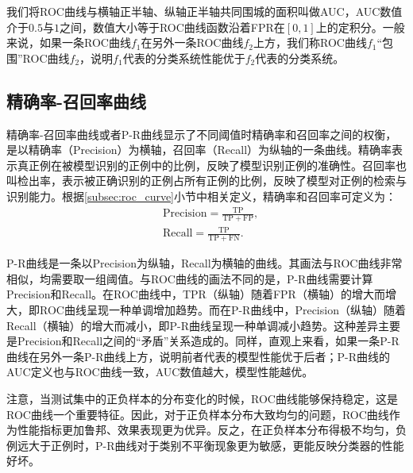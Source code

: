 我们将ROC曲线与横轴正半轴、纵轴正半轴共同围城的面积叫做AUC，AUC数值介于$0.5$与$1$之间，数值大小等于ROC曲线函数沿着FPR在$[0,1]$上的定积分。一般来说，如果一条ROC曲线$f_1$在另外一条ROC曲线$f_2$上方，我们称ROC曲线$f_1$“包围”ROC曲线$f_2$，说明$f_1$代表的分类系统性能优于$f_2$代表的分类系统。
\subsection{精确率-召回率曲线}\label{subsec:pr_curve}
精确率-召回率曲线或者P-R曲线显示了不同阈值时精确率和召回率之间的权衡，是以精确率（Precision）为横轴，召回率（Recall）为纵轴的一条曲线。精确率表示真正例在被模型识别的正例中的比例，反映了模型识别正例的准确性。召回率也叫检出率，表示被正确识别的正例占所有正例的比例，反映了模型对正例的检索与识别能力。根据\ref{subsec:roc_curve}小节中相关定义，精确率和召回率可定义为：
\begin{align}
	&\mathrm{Precision}=\frac{\mathrm{TP}}{\mathrm{TP}+\mathrm{FP}},\\
	&\mathrm{Recall}=\frac{\mathrm{TP}}{\mathrm{TP}+\mathrm{FN}}.
\end{align}


P-R曲线是一条以Precision为纵轴，Recall为横轴的曲线。其画法与ROC曲线非常相似，均需要取一组阈值。与ROC曲线的画法不同的是，P-R曲线需要计算Precision和Recall。在ROC曲线中，TPR（纵轴）随着FPR（横轴）的增大而增大，即ROC曲线呈现一种单调增加趋势。而在P-R曲线中，Precision（纵轴）随着Recall（横轴）的增大而减小，即P-R曲线呈现一种单调减小趋势。这种差异主要是Precision和Recall之间的“矛盾”关系造成的。同样，直观上来看，如果一条P-R曲线在另外一条P-R曲线上方，说明前者代表的模型性能优于后者；P-R曲线的AUC定义也与ROC曲线一致，AUC数值越大，模型性能越优。

注意，当测试集中的正负样本的分布变化的时候，ROC曲线能够保持稳定，这是ROC曲线一个重要特征。因此，对于正负样本分布大致均匀的问题，ROC曲线作为性能指标更加鲁邦、效果表现更为优异。反之，在正负样本分布得极不均匀，负例远大于正例时，P-R曲线对于类别不平衡现象更为敏感，更能反映分类器的性能好坏。

